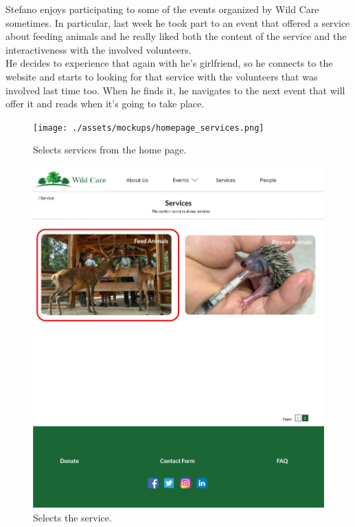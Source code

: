 Stefano enjoys participating to some of the events organized by Wild Care sometimes. In particular, last week he took part to an event that offered a service about feeding animals and he really liked both the content of the service and the interactiveness with the involved volunteers.\\
He decides to experience that again with he's girlfriend, so he connects to the website and starts to looking for that service with the volunteers that was involved last time too. When he finds it, he navigates to the next event that will offer it and reads when it's going to take place.

	\begin{figure}[h!]
		\centering
		\begin{minipage}[b]{0.8\textwidth}
    			\texttt{[image: ./assets/mockups/homepage\_services.png]}
			\caption{Selects services from the home page.}
		\end{minipage}
	\end{figure}

	\begin{figure}[h!]
		\centering
		\begin{minipage}[b]{1\textwidth}
    			\includegraphics[width=\textwidth]{./assets/mockups/services_servicedetails.png}
			\caption{Selects the service.}
		\end{minipage}
	\end{figure}

